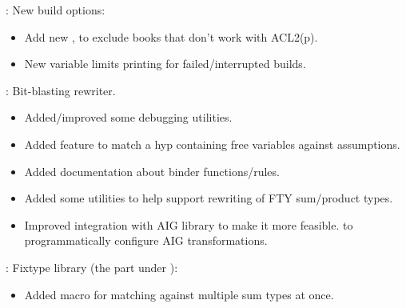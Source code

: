 \begin{frame}

\implibtitle

:
New build options:
\begin{itemize}
\item Add new  ,
      to exclude books that don't work with ACL2(p).
\item New  variable
      limits printing for failed/interrupted builds.
\end{itemize}

\end{frame}


\begin{frame}

\implibtitle

:
Bit-blasting rewriter.
\begin{itemize}
\item Added/improved some debugging utilities.
\item Added feature to match a hyp containing
      free variables against assumptions.
\item Added documentation about binder functions/rules.
\item Added some utilities to help support rewriting of FTY sum/product types.
\item Improved integration with AIG library to make it more feasible.
      to programmatically configure AIG transformations.
\end{itemize}

\end{frame}


\begin{frame}

\implibtitle

:
Fixtype library (the part under ):
\begin{itemize}
\item Added  macro for
      matching against multiple sum types at once.
\end{itemize}

\end{frame}


